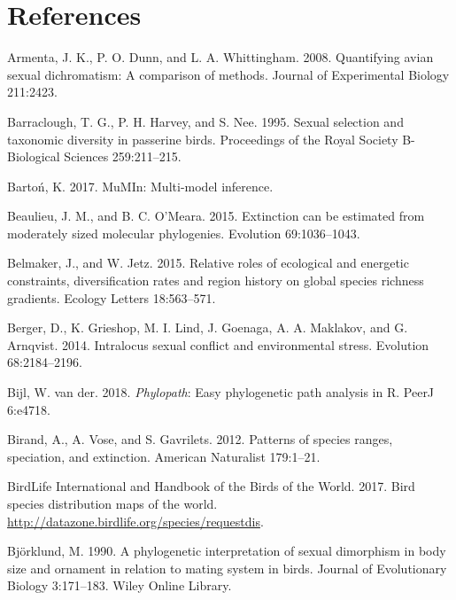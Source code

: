 \documentclass[]{article}
\begin{document}
\newpage{}

\hypertarget{references}{%
\section{References}\label{references}}

\hypertarget{refs}{}
\leavevmode\hypertarget{ref-Armenta_2008}{}%
Armenta, J. K., P. O. Dunn, and L. A. Whittingham. 2008. Quantifying
avian sexual dichromatism: A comparison of methods. Journal of
Experimental Biology 211:2423.

\leavevmode\hypertarget{ref-Barraclough_1995}{}%
Barraclough, T. G., P. H. Harvey, and S. Nee. 1995. Sexual selection and
taxonomic diversity in passerine birds. Proceedings of the Royal Society
B-Biological Sciences 259:211--215.

\leavevmode\hypertarget{ref-MuMIn_2017}{}%
Bartoń, K. 2017. MuMIn: Multi-model inference.

\leavevmode\hypertarget{ref-Beaulieu_2015}{}%
Beaulieu, J. M., and B. C. O'Meara. 2015. Extinction can be estimated
from moderately sized molecular phylogenies. Evolution 69:1036--1043.

\leavevmode\hypertarget{ref-Belmaker_2015}{}%
Belmaker, J., and W. Jetz. 2015. Relative roles of ecological and
energetic constraints, diversification rates and region history on
global species richness gradients. Ecology Letters 18:563--571.

\leavevmode\hypertarget{ref-Berger_2014}{}%
Berger, D., K. Grieshop, M. I. Lind, J. Goenaga, A. A. Maklakov, and G.
Arnqvist. 2014. Intralocus sexual conflict and environmental stress.
Evolution 68:2184--2196.

\leavevmode\hypertarget{ref-Wouter_2018}{}%
Bijl, W. van der. 2018. \emph{Phylopath}: Easy phylogenetic path
analysis in R. PeerJ 6:e4718.

\leavevmode\hypertarget{ref-Birand_2012}{}%
Birand, A., A. Vose, and S. Gavrilets. 2012. Patterns of species ranges,
speciation, and extinction. American Naturalist 179:1--21.

\leavevmode\hypertarget{ref-birdlife_2017}{}%
BirdLife International and Handbook of the Birds of the World. 2017.
Bird species distribution maps of the world.
\url{http://datazone.birdlife.org/species/requestdis}.

\leavevmode\hypertarget{ref-bjorklund_1990}{}%
Björklund, M. 1990. A phylogenetic interpretation of sexual dimorphism
in body size and ornament in relation to mating system in birds. Journal
of Evolutionary Biology 3:171--183. Wiley Online Library.
\end{document}
